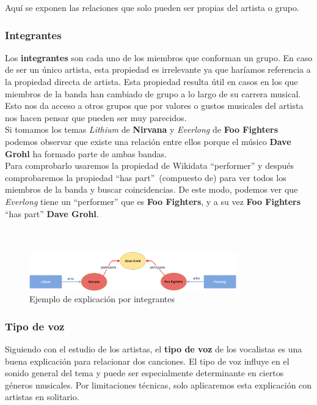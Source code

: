 Aquí se exponen las relaciones que solo pueden ser propias del artista o grupo.\\

\subsubsection*{Integrantes}

Los \textbf{integrantes} son cada uno de los miembros que conforman un grupo. En caso de ser un único artista, esta propiedad es irrelevante ya que haríamos referencia a la propiedad directa de artista. Esta propiedad resulta útil en casos en los que miembros de la banda han cambiado de grupo a lo largo de su carrera musical. Esto nos da acceso a otros grupos que por valores o gustos musicales del artista nos hacen pensar que pueden ser muy parecidos.\\

Si tomamos los temas \textit{Lithium} de \textbf{Nirvana} y \textit{Everlong} de \textbf{Foo Fighters} podemos observar que existe una relación entre ellos porque el músico \textbf{Dave Grohl} ha formado parte de ambas bandas.\\

Para comprobarlo usaremos la propiedad de Wikidata ``performer'' y después comprobaremos la propiedad ``has part''~(compuesto de) para ver todos los miembros de la banda y buscar coincidencias. De este modo, podemos ver que \textit{Everlong} tiene un ``performer'' que es \textbf{Foo Fighters}, y a su vez \textbf{Foo Fighters} ``has part'' \textbf{Dave Grohl}.\\\\\\

\begin{figure}[h!]
	\centering
	\includegraphics[width = 0.8\textwidth]{Imagenes/Bitmap/Integrante ejemplo.png}
	\caption{Ejemplo de explicación por integrantes}
	\label{fig:sampleImage}
\end{figure}

\subsubsection*{Tipo de voz}

Siguiendo con el estudio de los artistas, el \textbf{tipo de voz} de los vocalistas es una buena explicación para relacionar dos canciones. El tipo de voz influye en el sonido general del tema y puede ser especialmente determinante en ciertos géneros musicales. Por limitaciones técnicas, solo aplicaremos esta explicación con artistas en solitario.\\

